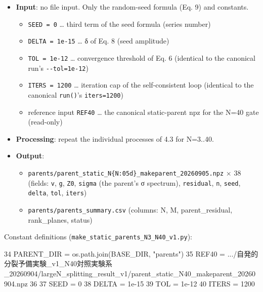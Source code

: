 \documentclass[
  a4paper,
]{ltjsarticle}
\newenvironment{Shaded}{}{}
\newcommand{\DecValTok}[1]{\textcolor[rgb]{0.25,0.63,0.44}{#1}}
\newcommand{\FloatTok}[1]{\textcolor[rgb]{0.25,0.63,0.44}{#1}}
\newcommand{\NormalTok}[1]{#1}
\newcommand{\OperatorTok}[1]{\textcolor[rgb]{0.40,0.40,0.40}{#1}}
\newcommand{\StringTok}[1]{\textcolor[rgb]{0.25,0.44,0.63}{#1}}
\providecommand{\tightlist}{%
  \setlength{\itemsep}{0pt}\setlength{\parskip}{0pt}}
\begin{document}
\begin{itemize}
\tightlist
\item
  \textbf{Input}: no file input. Only the random-seed formula (Eq. 9)
  and constants.

  \begin{itemize}
  \tightlist
  \item
    \texttt{SEED\ =\ 0} \ldots{} third term of the seed formula (series
    number)
  \item
    \texttt{DELTA\ =\ 1e-15} \ldots{} δ of Eq. 8 (seed amplitude)
  \item
    \texttt{TOL\ =\ 1e-12} \ldots{} convergence threshold of Eq. 6
    (identical to the canonical run's \texttt{-\/-tol=1e-12})
  \item
    \texttt{ITERS\ =\ 1200} \ldots{} iteration cap of the
    self-consistent loop (identical to the canonical \texttt{run()}'s
    \texttt{iters=1200})
  \item
    reference input \texttt{REF40} \ldots{} the canonical static-parent
    npz for the N=40 gate (read-only)
  \end{itemize}
\item
  \textbf{Processing}: repeat the individual processes of 4.3 for
  N=3..40.
\item
  \textbf{Output}:

  \begin{itemize}
  \tightlist
  \item
    \texttt{parents/parent\_static\_N\{N:05d\}\_makeparent\_20260905.npz}
    × 38 (fields: \texttt{v}, \texttt{g}, \texttt{Z0}, \texttt{sigma}
    (the parent's σ spectrum), \texttt{residual}, \texttt{n},
    \texttt{seed}, \texttt{delta}, \texttt{tol}, \texttt{iters})
  \item
    \texttt{parents/parents\_summary.csv} (columns: N, M,
    parent\_residual, rank\_planes, status)
  \end{itemize}
\end{itemize}

Constant definitions (\texttt{make\_static\_parents\_N3\_N40\_v1.py}):

\begin{Shaded}
\begin{Highlighting}[]
    \DecValTok{34}\NormalTok{  PARENT\_DIR }\OperatorTok{=}\NormalTok{ os.path.join(BASE\_DIR, }\StringTok{"parents"}\NormalTok{)}
    \DecValTok{35}\NormalTok{  REF40 }\OperatorTok{=} \StringTok{\textquotesingle{}.../自発的分裂予備実験\_v1\_N40対照実験系\_20260904/largeN\_splitting\_result\_v1/parent\_static\_N40\_makeparent\_20260904.npz\textquotesingle{}}
    \DecValTok{36}
    \DecValTok{37}\NormalTok{  SEED }\OperatorTok{=} \DecValTok{0}
    \DecValTok{38}\NormalTok{  DELTA }\OperatorTok{=} \FloatTok{1e{-}15}
    \DecValTok{39}\NormalTok{  TOL }\OperatorTok{=} \FloatTok{1e{-}12}
    \DecValTok{40}\NormalTok{  ITERS }\OperatorTok{=} \DecValTok{1200}
\end{Highlighting}
\end{Shaded}
\end{document}
